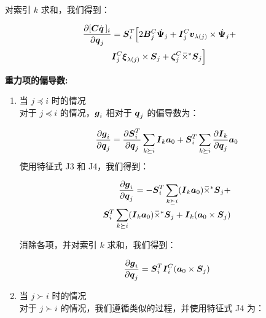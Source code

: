 \documentclass[letterpaper, 10 pt, conference]{ieeetran}  %
\begin{document}
{\begin{enumerate}
对索引 $k$ 求和，我们得到：

   \begin{equation}
      \begin{aligned}
         \frac{\partial  [\C \qd\,]_{i}}{\partial \q_{j}} &=     \Phibar_{i}^{T}  \Big[  2 \B_{j}^{C} \Psibardot_{j}  +     \I_{j}^{C} \v_{\lambda(j)} \times \Psibardot_{j}   + \\&
         \I_{j}^{C} \xibar_{\lambda(j)} \times \Phibar_{j}  + \zetabar_{j}^{C} \crff \Phibar_{j} \Big]  
        \label{partial_Cqdot_11}
      \end{aligned}
\end{equation}
 
\end{enumerate}


\vspace{1ex}
{\noindent \bf 重力项的偏导数:}

\begin{enumerate}
    \item 当 $j \preceq i$ 时的情况\\
    对于 $j \preceq i$ 的情况，$\boldsymbol{g}_{i}$ 相对于 $\boldsymbol{q}_{j}$ 的偏导数为：

\begin{equation}
     \frac{\partial \g_{i}}{ \partial \q_{j}} = \frac{\partial \Phibar_{i}^{T} }{\partial \q_{j}} \sum_{k \succeq i} \I_{k} \a_{0} + \Phibar_{i}^{T} \sum_{k \succeq i} \frac{\partial\I_{k} }{\partial \q_{j}} \a_{0}  
    \label{gFO_eqn_1}
\end{equation}
使用特征式 J3 和 J4，我们得到：

\begin{equation}
    \begin{aligned}
   \frac{\partial \g_{i}}{ \partial \q_{j}} = -\Phibar_{i}^{T} \sum_{k \succeq i} (\I_{k} \a_{0}) \crff  \Phibar_{j} + \\
    \Phibar_{i}^{T} \sum_{k \succeq i} (\I_{k} \a_{0}) \crff \Phibar_{j} + \I_{k}(\a_{0} \times \Phibar_{j}) 
     \end{aligned}
    \label{gFO_eqn_2}
\end{equation}

消除各项，并对索引 $k$ 求和，我们得到：

\begin{equation}
     \frac{\partial \g_{i}}{ \partial \q_{j}} = \Phibar_{i}^{T}  \I_{i}^{C}(\a_{0} \times \Phibar_{j})
    \label{gFO_eqn_3}
\end{equation}

    \item  当 $j \succ i$ 时的情况\\
    对于 $j \succ i$ 的情况，我们遵循类似的过程，并使用特征式 J4 为：


\end{enumerate}}
\end{document}
